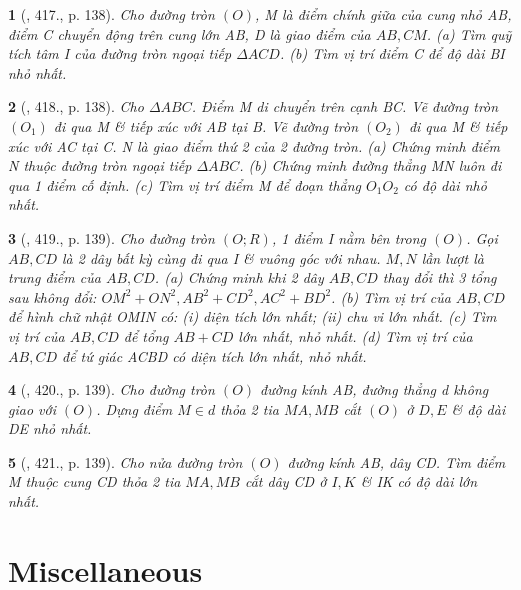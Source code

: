 \documentclass{article}
\newtheorem{baitoan}{}
\begin{document}
\begin{baitoan}[\cite{Binh_Toan_9_tap_2}, 417., p. 138]
	Cho đường tròn $(O)$, M là điểm chính giữa của cung nhỏ AB, điểm C chuyển động trên cung lớn AB, D là giao điểm của $AB,CM$. (a) Tìm quỹ tích tâm I của đường tròn ngoại tiếp $\Delta ACD$. (b) Tìm vị trí điểm C để độ dài BI nhỏ nhất.
\end{baitoan}

\begin{baitoan}[\cite{Binh_Toan_9_tap_2}, 418., p. 138]
	Cho $\Delta ABC$. Điểm M di chuyển trên cạnh BC. Vẽ đường tròn $(O_1)$ đi qua M \& tiếp xúc với AB tại B. Vẽ đường tròn $(O_2)$ đi qua M \& tiếp xúc với AC tại C. N là giao điểm thứ 2 của 2 đường tròn. (a) Chứng minh điểm N thuộc đường tròn ngoại tiếp $\Delta ABC$. (b) Chứng minh đường thẳng MN luôn đi qua 1 điểm cố định. (c) Tìm vị trí điểm M để đoạn thẳng $O_1O_2$ có độ dài nhỏ nhất.
\end{baitoan}

\begin{baitoan}[\cite{Binh_Toan_9_tap_2}, 419., p. 139]
	Cho đường tròn $(O;R)$, 1 điểm I nằm bên trong $(O)$. Gọi $AB,CD$ là 2 dây bất kỳ cùng đi qua I \& vuông góc với nhau. $M,N$ lần lượt là trung điểm của $AB,CD$. (a) Chứng minh khi 2 dây $AB,CD$ thay đổi thì 3 tổng sau không đổi: $OM^2 + ON^2,AB^2 + CD^2,AC^2 + BD^2$. (b) Tìm vị trí của $AB,CD$ để hình chữ nhật OMIN có: (i) diện tích lớn nhất; (ii) chu vi lớn nhất. (c) Tìm vị trí của $AB,CD$ để tổng $AB + CD$ lớn nhất, nhỏ nhất. (d) Tìm vị trí của $AB,CD$ để tứ giác ACBD có diện tích lớn nhất, nhỏ nhất.
\end{baitoan}

\begin{baitoan}[\cite{Binh_Toan_9_tap_2}, 420., p. 139]
	Cho đường tròn $(O)$ đường kính AB, đường thẳng d không giao với $(O)$. Dựng điểm $M\in d$ thỏa 2 tia $MA,MB$ cắt $(O)$ ở $D,E$ \& độ dài DE nhỏ nhất.
\end{baitoan}

\begin{baitoan}[\cite{Binh_Toan_9_tap_2}, 421., p. 139]
	Cho nửa đường tròn $(O)$ đường kính AB, dây CD. Tìm điểm M thuộc cung CD thỏa 2 tia $MA,MB$ cắt dây CD ở $I,K$ \& IK có độ dài lớn nhất.
\end{baitoan}


\section{Miscellaneous}
\end{document}
